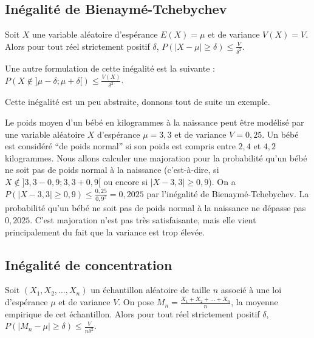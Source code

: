 	\subsection{Inégalité de Bienaymé-Tchebychev}

	\begin{formula}
		Soit $X$ une variable aléatoire d'espérance $E(X) = \mu$ et de variance $V(X) = V$. Alors pour tout réel strictement positif $\delta$, $P(|X-\mu| \geq \delta) \leq \frac{V}{\delta^2}$.
	\end{formula}

	\begin{tip}
		Une autre formulation de cette inégalité est la suivante : $P(X \notin ]\mu - \delta; \mu + \delta[) \leq \frac{V(X)}{\delta^2}$.
	\end{tip}

	\begin{nosummary}
		Cette inégalité est un peu abstraite, donnons tout de suite un exemple.

		\begin{tip}[Exemple]
			Le poids moyen d'un bébé en kilogrammes à la naissance peut être modélisé par une variable aléatoire $X$ d'espérance $\mu = 3,3$ et de variance $V = 0,25$.
			\newpar
			Un bébé est considéré ``de poids normal'' si son poids est compris entre $2,4$ et $4,2$ kilogrammes. Nous allons calculer une majoration pour la probabilité qu'un bébé ne soit pas de poids normal à la naissance (c'est-à-dire, si $X \notin ]3,3 - 0,9; 3,3 + 0,9[$ ou encore si $|X - 3,3| \geq 0,9$).
			\newpar
			On a $P(|X - 3,3| \geq 0,9) \leq \frac{0,25}{0,9^2} = 0,2025$ par l'inégalité de Bienaymé-Tchebychev.
			\newpar
			La probabilité qu'un bébé ne soit pas de poids normal à la naissance ne dépasse pas $0,2025$.
			\newpar
			C'est majoration n'est pas très satisfaisante, mais elle vient principalement du fait que la variance est trop élevée.
		\end{tip}
	\end{nosummary}

	\subsection{Inégalité de concentration}

	\begin{formula}
		Soit $(X_1, X_2, \dots, X_n)$ un échantillon aléatoire de taille $n$ associé à une loi d'espérance $\mu$ et de variance $V$. On pose $M_n = \frac{X_1 + X_2 + \dots + X_n}{n}$, la moyenne empirique de cet échantillon.
		\newpar
		Alors pour tout réel strictement positif $\delta$, $P(|M_n - \mu| \geq \delta) \leq \frac{V}{n \delta^2}$.
	\end{formula}

